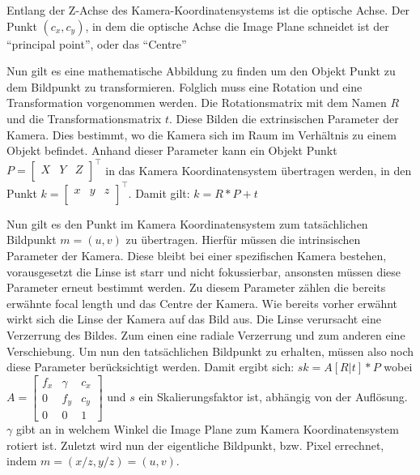 Entlang der Z-Achse des Kamera-Koordinatensystems ist die optische Achse. Der Punkt $(c_x,c_y)$, in dem die optische Achse die Image Plane schneidet ist der "`principal point"', oder das "`Centre"' \autocite[8]{Medioni:2004:ETC:993884}

Nun gilt es eine mathematische Abbildung zu finden um den Objekt Punkt zu dem Bildpunkt zu transformieren. Folglich muss eine Rotation und eine Transformation vorgenommen werden.
Die Rotationsmatrix mit dem Namen $R$ und die Transformationsmatrix $t$. Diese Bilden die extrinsischen Parameter der Kamera. Dies bestimmt, wo die Kamera sich im Raum im Verhältnis zu einem Objekt befindet. Anhand dieser Parameter kann ein  Objekt Punkt $P = \begin{bmatrix}X & Y& Z \\\end{bmatrix}^\intercal$ in das Kamera Koordinatensystem übertragen werden, in den Punkt $ k = \begin{bmatrix}x & y& z \\\end{bmatrix}^\intercal$. Damit gilt: 
$k = R * P + t$ 

Nun gilt es den Punkt im Kamera Koordinatensystem zum tatsächlichen Bildpunkt $m=(u,v)$ zu übertragen. Hierfür müssen die intrinsischen Parameter der Kamera. Diese bleibt bei einer spezifischen Kamera bestehen, vorausgesetzt die Linse ist starr und nicht fokussierbar, ansonsten müssen diese Parameter erneut bestimmt werden.
Zu diesem Parameter zählen die bereits erwähnte focal length und das Centre der Kamera. Wie bereits vorher erwähnt wirkt sich die Linse der Kamera auf das Bild aus. Die Linse verursacht eine Verzerrung des Bildes. Zum einen eine radiale Verzerrung und zum anderen eine Verschiebung. 
Um nun den tatsächlichen Bildpunkt zu erhalten, müssen also noch diese Parameter berücksichtigt werden. Damit ergibt sich:
$sk = A [R | t] * P 
$
wobei $A = \begin{bmatrix} f_x & \gamma & c_x \\
                             0 &  f_y   & c_y \\
                             0 &  0     &  1\end{bmatrix}$ und $s$ ein Skalierungsfaktor ist, abhängig von der Auflösung. $\gamma$ gibt an in welchem Winkel die Image Plane zum Kamera Koordinatensystem rotiert ist. Zuletzt wird nun der eigentliche Bildpunkt, bzw. Pixel errechnet, indem $m=(x/z, y/z)=(u,v)$.



